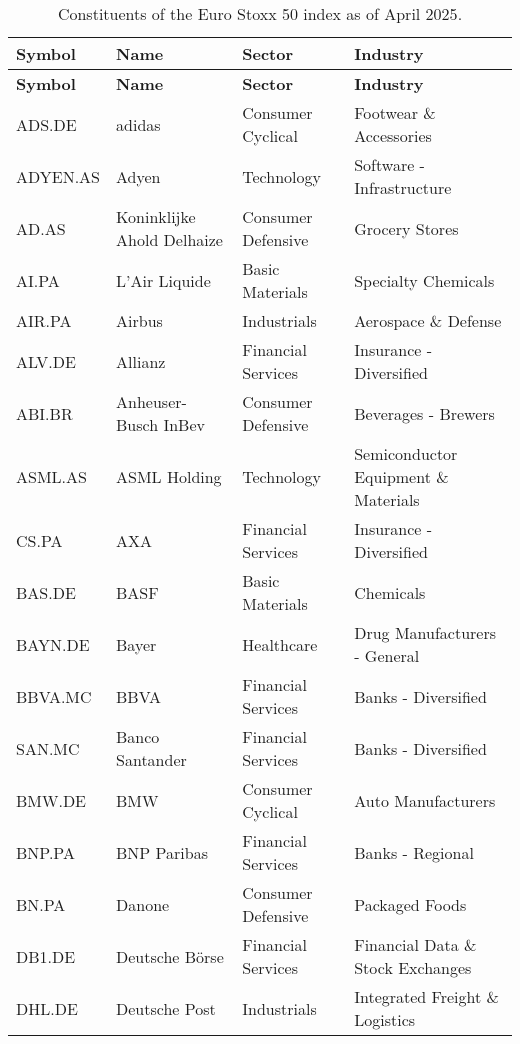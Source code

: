 \begin{longtable}{|p{2cm}|p{3cm}|p{4cm}|p{4cm}|}
\caption{Constituents of the Euro Stoxx 50 index as of April 2025\cite{EuroStoxx50}.}
\label{tab:eurostoxx50constituents}
\\ 
\hline
\textbf{Symbol} & \textbf{Name} & \textbf{Sector} & \textbf{Industry} \\ \midrule
\endfirsthead

\hline
\textbf{Symbol} & \textbf{Name} & \textbf{Sector} & \textbf{Industry} \\ \midrule
\endhead

\endfoot

\hline
ADS.DE & adidas & Consumer Cyclical & Footwear \& Accessories \\ \hline
ADYEN.AS & Adyen & Technology & Software - Infrastructure \\ \hline
AD.AS & Koninklijke Ahold Delhaize & Consumer Defensive & Grocery Stores \\ \hline
AI.PA & L'Air Liquide & Basic Materials & Specialty Chemicals \\ \hline
AIR.PA & Airbus & Industrials & Aerospace \& Defense \\ \hline
ALV.DE & Allianz & Financial Services & Insurance - Diversified \\ \hline
ABI.BR & Anheuser-Busch InBev & Consumer Defensive & Beverages - Brewers \\ \hline
ASML.AS & ASML Holding & Technology & Semiconductor Equipment \& Materials \\ \hline
CS.PA & AXA & Financial Services & Insurance - Diversified \\ \hline
BAS.DE & BASF & Basic Materials & Chemicals \\ \hline
BAYN.DE & Bayer & Healthcare & Drug Manufacturers - General \\ \hline
BBVA.MC & BBVA & Financial Services & Banks - Diversified \\ \hline
SAN.MC & Banco Santander & Financial Services & Banks - Diversified \\ \hline
BMW.DE & BMW & Consumer Cyclical & Auto Manufacturers \\ \hline
BNP.PA & BNP Paribas & Financial Services & Banks - Regional \\ \hline
BN.PA & Danone & Consumer Defensive & Packaged Foods \\ \hline
DB1.DE & Deutsche Börse & Financial Services & Financial Data \& Stock Exchanges \\ \hline
DHL.DE & Deutsche Post & Industrials & Integrated Freight \& Logistics \\ \hline

\end{longtable}
